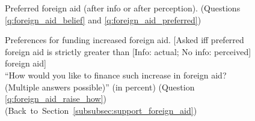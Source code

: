 \begin{figure} 
    \caption[Preferred foreign aid (summary)]{Preferred foreign aid (after info or after perception). (Questions \ref{q:foreign_aid_belief} and \ref{q:foreign_aid_preferred})}\label{fig:foreign_aid_no_less_all}
\end{figure} 

\begin{figure}[h!]
    \caption[Preferences for funding increased foreign aid]{Preferences for funding increased foreign aid. [Asked iff preferred foreign aid is strictly greater than [Info: actual; No info: perceived] foreign aid] \\ ``How would you like to finance such increase in foreign aid? (Multiple answers possible)'' (in percent) (Question \ref{q:foreign_aid_raise_how})  \hfill (Back~to~Section~\ref{subsubsec:support_foreign_aid})}\label{fig:foreign_aid_raise_how}
\end{figure}


